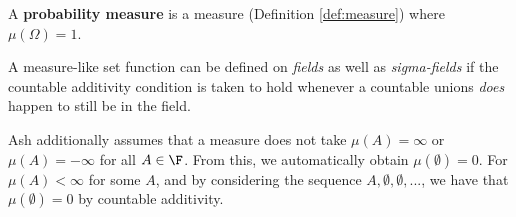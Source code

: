 \documentclass{article} %
\begin{document}
\begin{definition}
A \textbf{probability measure} is a measure (Definition \ref{def:measure}) where $\mu(\Omega)=1$.
\label{def:prob_measure}		
\end{definition}

\begin{remark}{}
A measure-like set function can be defined on \textit{fields} as well as \textit{sigma-fields} if the countable additivity condition is taken to hold whenever a countable unions \textit{does} happen to still be in the field.  	
\end{remark}

\begin{remark}
Ash additionally assumes that a measure does not take $\mu(A) = \infty$ or $\mu(A) = -\infty$ for all $A \in \F$.  From this, we automatically obtain $\mu(\emptyset)=0$. For $\mu(A) < \infty$ for some $A$, and by considering the sequence $A, \emptyset, \emptyset, ...$, we have that $\mu(\emptyset)=0$ by countable additivity.   	
\end{remark}



\end{document}
